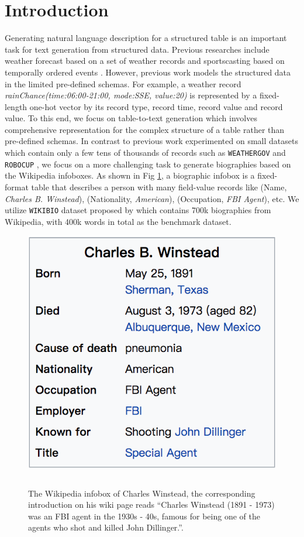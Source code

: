 \documentclass[letterpaper]{article} %
\begin{document}
\section{Introduction}
Generating natural language description for a structured table is an important task for text generation from structured data.
Previous researches include weather forecast based on a set of  weather records  \cite{liang2009learning} and sportscasting based on temporally ordered events  \cite{chen2008learning}. 
However, previous work models the structured data in the limited pre-defined schemas. For example, a weather record \textit{rainChance(time:06:00-21:00, mode:SSE, value:20)} is represented by a fixed-length one-hot vector by its record type, record time, record value and record value.
To this end, we focus on table-to-text generation which involves comprehensive representation for the complex structure of a table rather than pre-defined schemas.
In contrast to previous work experimented on small datasets which contain only a few tens of thousands of records such as 
\texttt{WEATHERGOV} \cite{liang2009learning} and \texttt{ROBOCUP} \cite{chen2008learning}, 
we focus on a more challenging task to generate biographies based on the Wikipedia infoboxes. 
As shown in Fig \ref{table1}, a biographic infobox is a fixed-format table that describes a person with many field-value records like (Name,\textit{ Charles B. Winstead}), (Nationality, \textit{American}), (Occupation, \textit{FBI Agent}), etc. 
We utilize \texttt{WIKIBIO} dataset proposed by \citeauthor{lebret2016neural}  which contains 700k biographies from Wikipedia, with 400k words in total as the benchmark dataset. 

\begin{figure}[t]
\centering
\includegraphics[width=0.6\linewidth]{intro}
\begin{tabular}{@{}c@{}@{}c@{}@{}c@{}@{}c@{}}
\end{tabular}
\caption{The Wikipedia infobox of Charles Winstead, the corresponding introduction on his wiki page reads ``Charles Winstead (1891 {}- 1973) was an FBI agent in the 1930s -{} 40s, famous for being one of the agents who shot and killed John Dillinger.''.}\label{table1}
\end{figure} 
\end{document}
